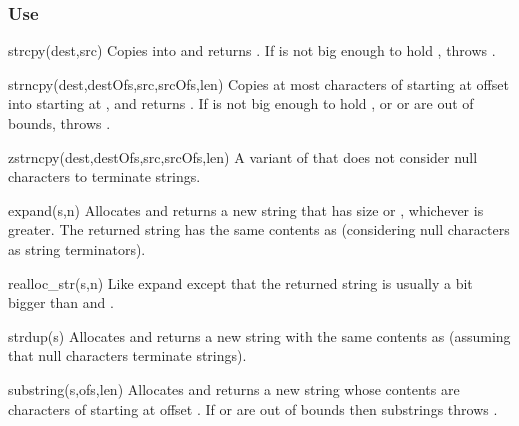 \subsubsection*{Use}

\begin{defun}{strcpy}{(dest,src)}
Copies  into  and returns .  If 
is not big enough to hold ,  throws
.
\end{defun}

\begin{defun}{strncpy}{(dest,destOfs,src,srcOfs,len)}
Copies at most  characters of  starting at offset
 into  starting at , and returns
.  If  is not big enough to hold , or
 or  are out of bounds,  throws
.
\end{defun}

\begin{defun}{zstrncpy}{(dest,destOfs,src,srcOfs,len)}
A variant of  that does not consider null characters to
terminate strings.
\end{defun}

\begin{defun}{expand}{(s,n)}
Allocates and returns a new string that has size  or
, whichever is greater.  The returned string has
the same contents as  (considering null characters as string
terminators).
\end{defun}

\begin{defun}{realloc_str}{(s,n)}
Like expand except that the returned string is usually a bit bigger than
 and .
\end{defun}

\begin{defun}{strdup}{(s)}
Allocates and returns a new string with the same contents as 
(assuming that null characters terminate strings).
\end{defun}

\begin{defun}{substring}{(s,ofs,len)}
Allocates and returns a new string whose contents are 
characters of  starting at offset .  If  or
 are out of bounds then substrings throws
.
\end{defun}

